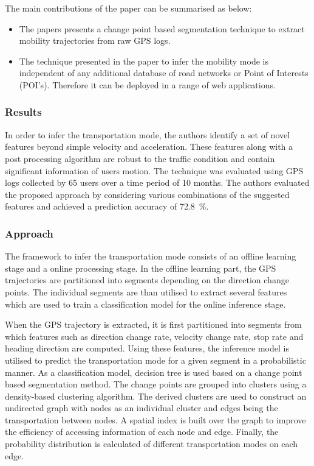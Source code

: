 The main contributions of the paper can be summarised as below:

\begin{itemize}
	\item The papers presents a change point based segmentation technique to extract mobility 
	trajectories from raw GPS logs. 
	
	\item The technique presented in the paper to infer the mobility mode is independent 
	of any additional database of road networks or Point of Interests (POI's). Therefore it can 
	be deployed in a range of web applications. 
\end{itemize}

\subsubsection*{Results}

In order to infer the transportation mode, the authors identify a set of novel features beyond
simple velocity and acceleration. These features along with a post processing algorithm are
robust to the traffic condition and contain significant information of users motion. The technique
was evaluated using GPS logs collected by 65 users over a time period of 10 months. The authors
evaluated the proposed approach by considering various combinations of the suggested features
and achieved a prediction accuracy of 72.8~\%.

\subsubsection*{Approach}

The framework to infer the transportation mode consists of an offline learning stage and a online
processing stage. In the offline learning part, the GPS trajectories are partitioned into segments
depending on the direction change points. The individual segments are than utilised to extract
several features which are used to train a classification model for the online inference stage.\newline

When the GPS trajectory is extracted, it is first partitioned into segments from which features such as
direction change rate, velocity change rate, stop rate and heading direction are computed.
Using these features, the inference model is utilised to predict the transportation mode for
a given segment in a probabilistic manner. As a classification model, decision tree is used based on
a change point based segmentation method. The change points are grouped into clusters using
a density-based clustering algorithm. The derived clusters are used to construct an undirected graph
with nodes as an individual cluster and edges being the transportation between nodes. A spatial index is
built over the graph to improve the efficiency of accessing information of each node and edge. Finally,
the probability distribution is calculated of different transportation modes on each edge.

